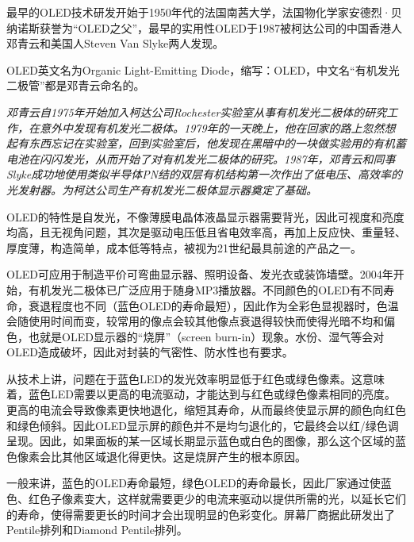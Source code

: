\documentclass{beamer}
\newenvironment{slide}{
    \begin{frame}{\bfseries{\sectiontitle}}
}{
    \end{frame}
}
\begin{document}
\begin{slide}
最早的OLED技术研发开始于1950年代的法国南茜大学，法国物化学家安德烈·贝纳诺斯获誉为“OLED之父”，最早的实用性OLED于1987被柯达公司的中国香港人邓青云和美国人Steven Van Slyke两人发现。

OLED英文名为Organic Light-Emitting Diode，缩写：OLED，中文名“有机发光二极管”都是邓青云命名的。
\medskip

\small\textit{邓青云自1975年开始加入柯达公司Rochester实验室从事有机发光二极体的研究工作，在意外中发现有机发光二极体。1979年的一天晚上，他在回家的路上忽然想起有东西忘记在实验室，回到实验室后，他发现在黑暗中的一块做实验用的有机蓄电池在闪闪发光，从而开始了对有机发光二极体的研究。1987年，邓青云和同事Slyke成功地使用类似半导体PN结的双层有机结构第一次作出了低电压、高效率的光发射器。为柯达公司生产有机发光二极体显示器奠定了基础。}
\end{slide}

\begin{slide}
OLED的特性是自发光，不像薄膜电晶体液晶显示器需要背光，因此可视度和亮度均高，且无视角问题，其次是驱动电压低且省电效率高，再加上反应快、重量轻、厚度薄，构造简单，成本低等特点，被视为21世纪最具前途的产品之一。
\bigskip

OLED可应用于制造平价可弯曲显示器、照明设备、发光衣或装饰墙壁。2004年开始，有机发光二极体已广泛应用于随身MP3播放器。不同颜色的OLED有不同寿命，衰退程度也不同（蓝色OLED的寿命最短），因此作为全彩色显视器时，色温会随使用时间而变，较常用的像点会较其他像点衰退得较快而使得光暗不均和偏色，也就是OLED显示器的“烧屏”（screen burn-in）现象。水份、湿气等会对OLED造成破坏，因此对封装的气密性、防水性也有要求。
\end{slide}

\begin{slide}
从技术上讲，问题在于蓝色LED的发光效率明显低于红色或绿色像素。这意味着，蓝色LED需要以更高的电流驱动，才能达到与红色或绿色像素相同的亮度。更高的电流会导致像素更快地退化，缩短其寿命，从而最终使显示屏的颜色向红色和绿色倾斜。因此OLED显示屏的颜色并不是均匀退化的，它最终会以红/绿色调呈现。因此，如果面板的某一区域长期显示蓝色或白色的图像，那么这个区域的蓝色像素会比其他区域退化得更快。这是烧屏产生的根本原因。
\bigskip

一般来讲，蓝色的OLED寿命最短，绿色OLED的寿命最长，因此厂家通过使蓝色、红色子像素变大，这样就需要更少的电流来驱动以提供所需的光，以延长它们的寿命，使得需要更长的时间才会出现明显的色彩变化。屏幕厂商据此研发出了Pentile排列和Diamond Pentile排列。
\end{slide}
\end{document}
